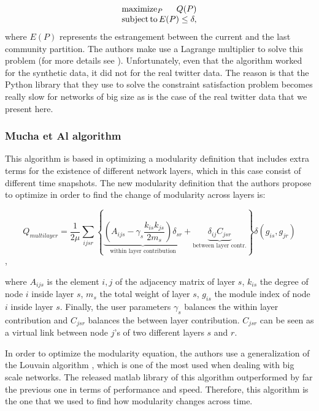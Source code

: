\documentclass[12pt]{article}
\begin{document}
\begin{equation}
\begin{array}{l}
\operatorname*{maximize}_{P} \hfill Q(P)\\
\operatorname*{subject\, to} \hfill E(P) \le \delta,
\end{array} 
\label{eq.opt}
\end{equation}
where $E(P)$ represents the estrangement between the current
and the last community partition. The authors make use a Lagrange
multiplier to solve this problem (for more details see \cite{kawadia2012sequential}). Unfortunately, even that the algorithm
worked for the synthetic data, it did not for the real twitter
data. The reason is that the Python library that
they use to solve the constraint satisfaction problem becomes really
slow for networks of big size as is the case of the real twitter data
that we present here.

\subsubsection{Mucha et Al algorithm}

This algorithm is based in optimizing a modularity definition that
includes extra terms for the existence of different network layers,
which in this case consist of different time snapshots. The new
modularity definition that the authors propose to optimize
in order to find the change of modularity across layers is:

\begin{equation}
Q_{multilayer} = \frac{1}{2\mu} 
\sum_{ijsr} \left\{ \underbrace{ \left( 
A_{ijs}
 - \gamma_s \frac{k_{is} k_{js}}{2m_s}\right) \delta_{sr} 
 }_{\text{within layer contribution}}
 + \underbrace{\delta_{ij} C_{jsr}}_{\text{between layer contr.}}
 \right\} \delta(g_{is},g_{jr})
\label{eq.q.layers}
\end{equation},


where $A_{ijs}$ is the element $i,j$ of the adjacency matrix of layer
$s$, $k_{is}$ the degree of node $i$ inside layer $s$, $m_s$ the
total weight of layer $s$, $g_{is}$ the module index of node $i$ inside
layer $s$. Finally, the user parameters $\gamma_s$ balances
the within layer contribution and $C_{jsr}$ balances the
between layer contribution. $C_{jsr}$ can be seen as a virtual
link between node $j$'s of two different layers $s$ and $r$.

In order to optimize the modularity equation, the authors use
a generalization of the Louvain algorithm \cite{blondel2008fast}, which
is one of the most used when dealing with big scale networks.
The released matlab library of this algorithm outperformed
by far the previous one in terms of performance and speed. Therefore,
this algorithm is the one that we used to find how modularity
changes across time.
\end{document}
